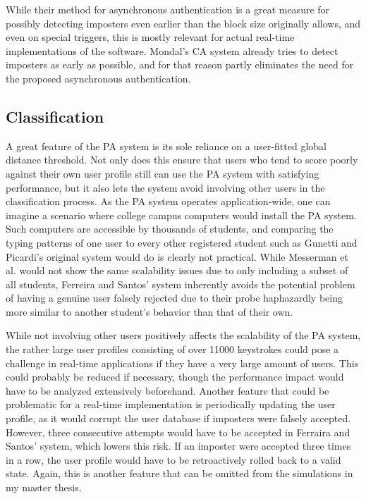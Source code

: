 \documentclass[informationsecurity]{gucmasterproject}
\begin{document}
While their method for asynchronous authentication is a great measure for possibly detecting imposters even earlier than the block size originally allows, and even on special triggers, this is mostly relevant for actual real-time implementations of the software.
Mondal's CA system already tries to detect imposters as early as possible, and for that reason partly eliminates the need for the proposed asynchronous authentication.

\subsection{Classification}
A great feature of the PA system is its sole reliance on a user-fitted global distance threshold.
Not only does this ensure that users who tend to score poorly against their own user profile still can use the PA system with satisfying performance, but it also lets the system avoid involving other users in the classification process.
As the PA system operates application-wide, one can imagine a scenario where college campus computers would install the PA system.
Such computers are accessible by thousands of students, and comparing the typing patterns of one user to every other registered student such as Gunetti and Picardi's original system would do \cite{gnp} is clearly not practical.
While Messerman et al. \cite{Messerman} would not show the same scalability issues due to only including a subset of all students, Ferreira and Santos' system inherently avoids the potential problem of having a genuine user falsely rejected due to their probe haphazardly being more similar to another student's behavior than that of their own.

While not involving other users positively affects the scalability of the PA system, the rather large user profiles consisting of over 11000 keystrokes could pose a challenge in real-time applications if they have a very large amount of users.
This could probably be reduced if necessary, though the performance impact would have to be analyzed extensively beforehand.
Another feature that could be problematic for a real-time implementation is periodically updating the user profile, as it would corrupt the user database if imposters were falsely accepted.
However, three consecutive attempts would have to be accepted in Ferraira and Santos' system, which lowers this risk.
If an imposter were accepted three times in a row, the user profile would have to be retroactively rolled back to a valid state.
Again, this is another feature that can be omitted from the simulations in my master thesis.
\end{document}
